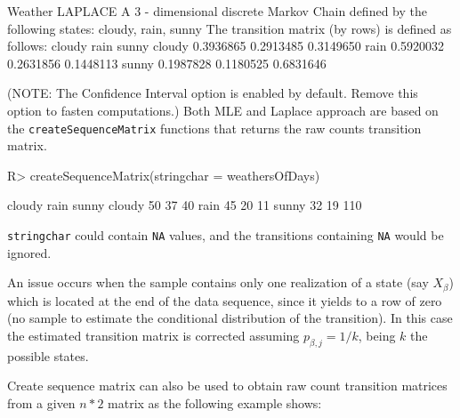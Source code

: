 \documentclass[
  nojss]{jss}
\begin{document}
\begin{CodeChunk}


\begin{CodeOutput}
Weather LAPLACE 
 A  3 - dimensional discrete Markov Chain defined by the following states: 
 cloudy, rain, sunny 
 The transition matrix  (by rows)  is defined as follows: 
          cloudy      rain     sunny
cloudy 0.3936865 0.2913485 0.3149650
rain   0.5920032 0.2631856 0.1448113
sunny  0.1987828 0.1180525 0.6831646
\end{CodeOutput}
\end{CodeChunk}

(NOTE: The Confidence Interval option is enabled by default. Remove this option to fasten computations.) Both MLE and Laplace approach are based on the \texttt{createSequenceMatrix} functions that returns the raw counts transition matrix.

\begin{CodeChunk}

\begin{CodeInput}
R> createSequenceMatrix(stringchar = weathersOfDays)
\end{CodeInput}

\begin{CodeOutput}
       cloudy rain sunny
cloudy     50   37    40
rain       45   20    11
sunny      32   19   110
\end{CodeOutput}
\end{CodeChunk}

\texttt{stringchar} could contain \texttt{NA} values, and the transitions containing \texttt{NA} would be ignored.

An issue occurs when the sample contains only one realization of a state (say \(X_{\beta}\)) which is located at the end of the data sequence, since it yields to a row of zero (no sample to estimate the conditional distribution of the transition). In this case the estimated transition matrix is corrected assuming \(p_{\beta,j}=1/k\), being \(k\) the possible states.

Create sequence matrix can also be used to obtain raw count transition matrices from a given \(n*2\) matrix as the following example shows:
\end{document}
